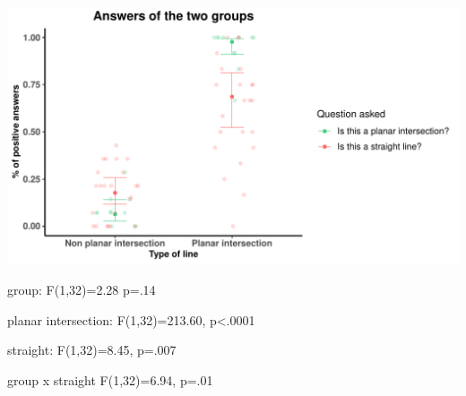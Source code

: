 \documentclass[11pt]{beamer}
\begin{document}
        \begin{frame}

          \begin{centering}
            
          \includegraphics[scale=0.5]{two_groups.pdf}

          \end{centering}

          
          \footnotesize{
          group:  F(1,32)=2.28  p=.14}
          
          planar intersection: F(1,32)=213.60, p<.0001
          
          straight: F(1,32)=8.45, p=.007
          
          group x straight F(1,32)=6.94, p=.01


        \end{frame}



          





\end{document}
